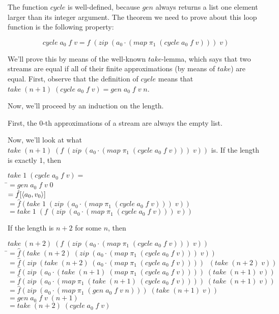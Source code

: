 \documentclass{article}
\begin{document}
The function $cycle$ is well-defined, because $gen$ always returns a
list one element larger than its integer argument. 
The theorem we need to prove about this loop function is the following
property:

\begin{displaymath}
  cycle\;a_0\;f\;v = f\;(zip\;(a_0 \cdot (map\;\pi_1\;(cycle\;a_0\;f\;v)))\;v)
\end{displaymath}

We'll prove this by means of the well-known $take$-lemma, which says
that two streams are equal if all of their finite approximations (by
means of $take$) are equal.  First, observe that the definition of
$cycle$ means that $take\;(n+1)\;(cycle\;a_0\;f\;v) =
gen\;a_0\;f\;v\;n$.

Now, we'll proceed by an induction on the length. 

First, the 0-th approximations of a stream are always the empty list.

Now, we'll look at what $take\;(n+1)\;(f\;(zip\;(a_0 \cdot
(map\;\pi_1\;(cycle\;a_0\;f\;v)))\;v))$ is. If the length is exactly 1, then 

\begin{tabbing}
$take\;1\;(cycle\;a_0\;f\;v) = $ \\
\;\;\=$= gen\;a_0\;f\;v\;0$ \\
    \>$= \hat{f}[\left<{a_0},{v_0}\right>]$ \\
    \>$= \hat{f}(take\;1\;(zip\;(a_0 \cdot (map\;\pi_1\;(cycle\;a_0\;f\;v)))\;v))$ \\
    \>$= take\;1\;(f\;(zip\;(a_0 \cdot (map\;\pi_1\;(cycle\;a_0\;f\;v)))\;v))$\\
\end{tabbing}

\noindent If the length is $n + 2$ for some $n$, then 


\begin{tabbing}
$take\;(n+2)\;(f\;(zip\;(a_0 \cdot (map\;\pi_1\;(cycle\;a_0\;f\;v)))\;v))$ \\
\;\;\=$= \hat{f}(take\;(n+2)\;(zip\;(a_0 \cdot (map\;\pi_1\;(cycle\;a_0\;f\;v)))\;v))$ \\
  \>$= \hat{f}(zip\;(take\;(n+2)\;(a_0 \cdot (map\;\pi_1\;(cycle\;a_0\;f\;v))))\;
                  \;(take\;(n+2)\;v))$ \\
  \>$= \hat{f}(zip\;(a_0 \cdot (take\;(n+1)\;(map\;\pi_1\;(cycle\;a_0\;f\;v))))
                  \;(take\;(n+1)\;v))$ \\
  \>$= \hat{f}(zip\;(a_0 \cdot (map\;\pi_1\;(take\;(n+1)\;(cycle\;a_0\;f\;v))))
                  \;(take\;(n+1)\;v))$ \\
  \>$= \hat{f}(zip\;(a_0 \cdot (map\;\pi_1\;(gen\;a_0\;f\;v\;n)))
                  \;(take\;(n+1)\;v))$ \\
  \>$= gen\;a_0\;f\;v\;(n+1)$ \\
  \>$= take\;(n+2)\;(cycle\;a_0\;f\;v)$ \\
\end{tabbing}
\end{document}

